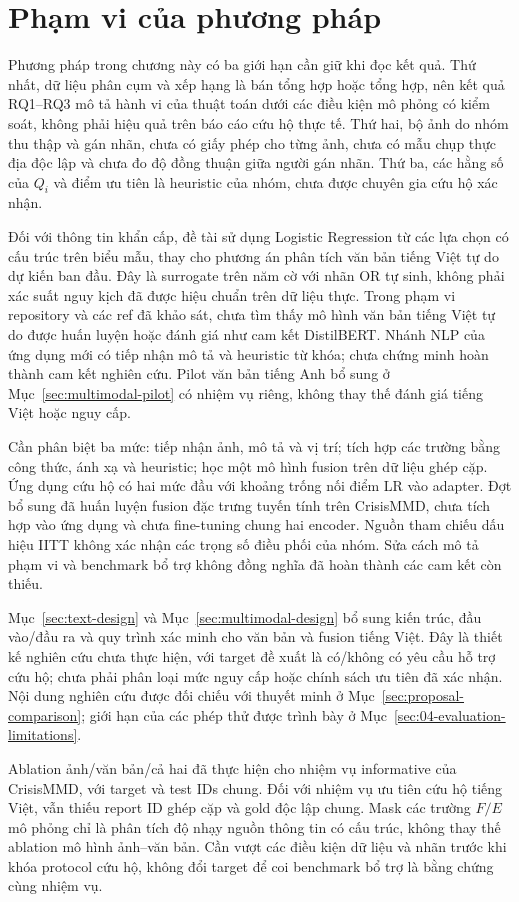 \section{Phạm vi của phương pháp}\label{sec:02-scope}
Phương pháp trong chương này có ba giới hạn cần giữ khi đọc kết quả. Thứ nhất, dữ liệu phân cụm và xếp hạng là bán tổng hợp hoặc tổng hợp, nên kết quả RQ1--RQ3 mô tả hành vi của thuật toán dưới các điều kiện mô phỏng có kiểm soát, không phải hiệu quả trên báo cáo cứu hộ thực tế. Thứ hai, bộ ảnh do nhóm thu thập và gán nhãn, chưa có giấy phép cho từng ảnh, chưa có mẫu chụp thực địa độc lập và chưa đo độ đồng thuận giữa người gán nhãn. Thứ ba, các hằng số của $Q_i$ và điểm ưu tiên là heuristic của nhóm, chưa được chuyên gia cứu hộ xác nhận.

Đối với thông tin khẩn cấp, đề tài sử dụng Logistic Regression từ các lựa chọn có cấu trúc trên biểu mẫu, thay cho phương án phân tích văn bản tiếng Việt tự do dự kiến ban đầu. Đây là surrogate trên năm cờ với nhãn OR tự sinh, không phải xác suất nguy kịch đã được hiệu chuẩn trên dữ liệu thực. Trong phạm vi repository và các ref đã khảo sát, chưa tìm thấy mô hình văn bản tiếng Việt tự do được huấn luyện hoặc đánh giá như cam kết DistilBERT. Nhánh NLP của ứng dụng mới có tiếp nhận mô tả và heuristic từ khóa; chưa chứng minh hoàn thành cam kết nghiên cứu. Pilot văn bản tiếng Anh bổ sung ở Mục~\ref{sec:multimodal-pilot} có nhiệm vụ riêng, không thay thế đánh giá tiếng Việt hoặc nguy cấp.

Cần phân biệt ba mức: tiếp nhận ảnh, mô tả và vị trí; tích hợp các trường bằng công thức, ánh xạ và heuristic; học một mô hình fusion trên dữ liệu ghép cặp. Ứng dụng cứu hộ có hai mức đầu với khoảng trống nối điểm LR vào adapter. Đợt bổ sung đã huấn luyện fusion đặc trưng tuyến tính trên CrisisMMD, chưa tích hợp vào ứng dụng và chưa fine-tuning chung hai encoder. Nguồn tham chiếu dấu hiệu IITT không xác nhận các trọng số điều phối của nhóm. Sửa cách mô tả phạm vi và benchmark bổ trợ không đồng nghĩa đã hoàn thành các cam kết còn thiếu.

Mục~\ref{sec:text-design} và Mục~\ref{sec:multimodal-design} bổ sung kiến trúc, đầu vào/đầu ra và quy trình xác minh cho văn bản và fusion tiếng Việt. Đây là thiết kế nghiên cứu chưa thực hiện, với target đề xuất là có/không có yêu cầu hỗ trợ cứu hộ; chưa phải phân loại mức nguy cấp hoặc chính sách ưu tiên đã xác nhận. Nội dung nghiên cứu được đối chiếu với thuyết minh ở Mục~\ref{sec:proposal-comparison}; giới hạn của các phép thử được trình bày ở Mục~\ref{sec:04-evaluation-limitations}.

Ablation ảnh/văn bản/cả hai đã thực hiện cho nhiệm vụ informative của CrisisMMD, với target và test IDs chung. Đối với nhiệm vụ ưu tiên cứu hộ tiếng Việt, vẫn thiếu report ID ghép cặp và gold độc lập chung. Mask các trường $F/E$ mô phỏng chỉ là phân tích độ nhạy nguồn thông tin có cấu trúc, không thay thế ablation mô hình ảnh--văn bản. Cần vượt các điều kiện dữ liệu và nhãn trước khi khóa protocol cứu hộ, không đổi target để coi benchmark bổ trợ là bằng chứng cùng nhiệm vụ.
